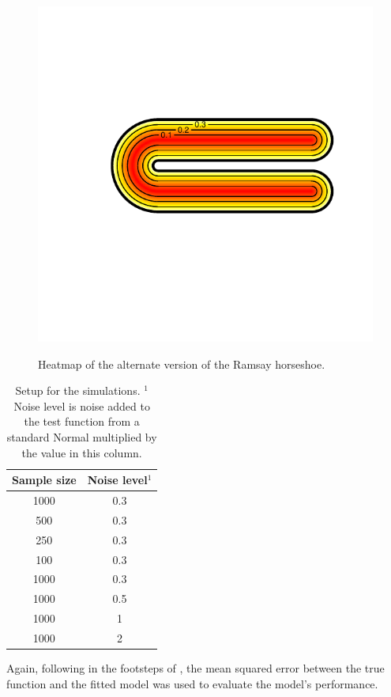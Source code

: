 \documentclass[a4paper,10pt]{amsart}
\begin{document}
\begin{figure}
\centering
\includegraphics[trim=0in 1.5in 0in 1in]{figs/altramsayhorseshoe.pdf} \\
\caption{Heatmap of the alternate version of the Ramsay horseshoe.}
\label{altramsayshorseshoe}
\end{figure}

\begin{table}[ht]
\begin{tabular}{c c}\\
Sample size & Noise level$^{1}$ \\
\hline
1000 & 0.3 \\
500 & 0.3 \\
250 & 0.3 \\
100 & 0.3 \\
1000 & 0.3 \\
1000 & 0.5 \\
1000 & 1 \\
1000 & 2 \\
\end{tabular}
\caption{Setup for the simulations. $^{1}$Noise level is noise added to the test function from a standard Normal multiplied by the value in this column. }
\end{table}

Again, following in the footsteps of \cite{soap}, the mean squared error between the true function and the fitted model was used to evaluate the model's performance.
\end{document}
